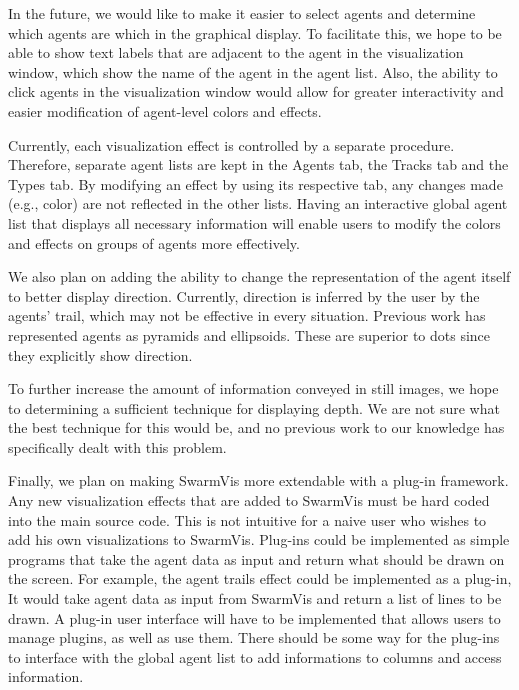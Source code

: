 \documentclass[conference]{IEEEtran}
\begin{document}
In the future, we would like to make it easier to select agents and determine which agents are which in the graphical display.
To facilitate this, we hope to be able to show text labels that are adjacent to the agent in the visualization window, which
show the name of the agent in the agent list.
Also, the ability to click agents in the visualization window would allow for greater
interactivity and easier modification of agent-level colors and effects.

Currently, each visualization effect is controlled by a separate procedure.
Therefore, separate agent lists are kept in the Agents tab, the Tracks tab and the Types tab.
By modifying an effect by using its respective tab, any changes made (e.g., color) are not reflected in the other lists.
Having an interactive global agent list that displays all necessary information will enable users to modify
the colors and effects on groups of agents more effectively. 

We also plan on adding the ability to change the representation of the agent itself to better display direction.
Currently, direction is inferred by the user by the agents' trail, which may not be effective in every situation.
Previous work has represented agents as 
pyramids\cite{spector2005ecb}  and ellipsoids\cite{10.1109/TVCG.2005.87}.
These are superior to dots since they explicitly show direction.

To further increase the amount of information conveyed in still images,
we hope to determining a sufficient technique for displaying depth.
We are not sure what the best technique for this would be,
and no previous work to our knowledge has specifically dealt with this problem.

Finally, we plan on making SwarmVis more extendable with a plug-in framework.
Any new visualization effects that are added to SwarmVis must be hard coded into the main source code.
This is not intuitive for a naive user who wishes to add his own visualizations to SwarmVis.
Plug-ins could be implemented as simple programs that take the agent data as input and return
what should be drawn on the screen. For example, the agent trails effect could be implemented as a plug-in,
It would take agent data as input from SwarmVis and return a list of lines to be drawn.
A plug-in user interface will have to be implemented that allows users to manage plugins, as well as use them.
There should be some way for the plug-ins to interface with the global agent list to add informations to columns
and access information.
\end{document}
